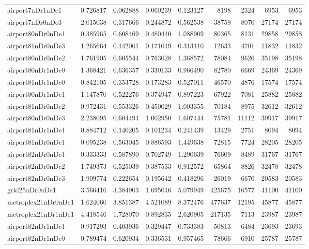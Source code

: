 \begin{longtable}{|l|r|r|r|r|r|r|r|r|}
airport7nDr1nDe1 & 0.726817 & 0.062888 & 0.060239 & 0.123127 & 8198 & 2324 & 6953 & 6953 \\
airport7nDr0nDe3 & 2.015038 & 0.317666 & 0.244872 & 0.562538 & 38759 & 8070 & 27174 & 27174 \\
airport80nDr0nDe1 & 0.385965 & 0.608469 & 0.480440 & 1.088909 & 80365 & 8131 & 29858 & 29858 \\
airport81nDr0nDe3 & 1.265664 & 0.142061 & 0.171049 & 0.313110 & 12633 & 4701 & 11832 & 11832 \\
airport80nDr0nDe2 & 1.761905 & 0.605544 & 0.763028 & 1.368572 & 78084 & 9626 & 35198 & 35198 \\
airport80nDr1nDe0 & 1.368421 & 0.636357 & 0.330133 & 0.966490 & 82780 & 6669 & 24369 & 24369 \\
airport81nDr1nDe0 & 0.842105 & 0.353728 & 0.173283 & 0.527011 & 46570 & 4876 & 17574 & 17574 \\
airport80nDr1nDe1 & 1.147870 & 0.522276 & 0.374947 & 0.897223 & 67922 & 7081 & 25882 & 25882 \\
airport81nDr0nDe2 & 0.972431 & 0.553326 & 0.450029 & 1.003355 & 70184 & 8975 & 32612 & 32612 \\
airport80nDr0nDe3 & 2.238095 & 0.604494 & 1.002950 & 1.607444 & 75781 & 11112 & 39917 & 39917 \\
airport81nDr1nDe1 & 0.884712 & 0.140205 & 0.101234 & 0.241439 & 13429 & 2751 & 8094 & 8094 \\
airport81nDr0nDe1 & 0.095238 & 0.563045 & 0.886593 & 1.449638 & 72815 & 7724 & 28205 & 28205 \\
airport82nDr0nDe1 & 0.333333 & 0.587890 & 0.702749 & 1.290639 & 76609 & 8489 & 31767 & 31767 \\
airport82nDr0nDe2 & 1.749373 & 0.525039 & 0.387533 & 0.912572 & 65864 & 8826 & 32478 & 32478 \\
airport82nDr0nDe3 & 1.909774 & 0.222654 & 0.195642 & 0.418296 & 26019 & 6670 & 20583 & 20583 \\
grid25nDr0nDe1 & 3.566416 & 3.384903 & 1.695046 & 5.079949 & 425675 & 16577 & 41100 & 41100 \\
metroplex21nDr0nDe1 & 1.624060 & 3.851387 & 4.521089 & 8.372476 & 477637 & 12195 & 45877 & 45877 \\
metroplex21nDr1nDe1 & 4.418546 & 1.728070 & 0.892835 & 2.620905 & 217135 & 7113 & 23987 & 23987 \\
airport82nDr1nDe1 & 0.917293 & 0.403936 & 0.329447 & 0.733383 & 50813 & 6484 & 23693 & 23693 \\
airport82nDr1nDe0 & 0.789474 & 0.620934 & 0.336531 & 0.957465 & 78666 & 6910 & 25787 & 25787 \\

\end{longtable}
